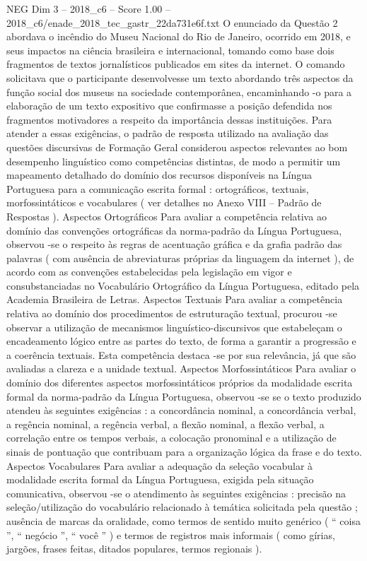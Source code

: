 \begin{textsample}{NEG Dim 3 – 2018\_c6 – Score 1.00 – 2018\_c6/enade\_2018\_tec\_gastr\_22da731e6f.txt}
O enunciado da Questão 2 abordava o incêndio do Museu Nacional do Rio de Janeiro, ocorrido em 2018, e seus impactos na ciência brasileira e internacional, tomando como base dois fragmentos de textos jornalísticos publicados em sites da internet.
O comando solicitava que o participante desenvolvesse um texto abordando três aspectos da função social dos museus na sociedade contemporânea, encaminhando -o para a elaboração de um texto expositivo que confirmasse a posição defendida nos fragmentos motivadores a respeito da importância dessas instituições.
Para atender a essas exigências, o padrão de resposta utilizado na avaliação das questões discursivas de Formação Geral considerou aspectos relevantes ao bom desempenho linguístico como competências distintas, de modo a permitir um mapeamento detalhado do domínio dos recursos disponíveis na Língua Portuguesa para a comunicação escrita formal : ortográficos, textuais, morfossintáticos e vocabulares ( ver detalhes no Anexo VIII – Padrão de Respostas ).
Aspectos Ortográficos Para avaliar a competência relativa ao domínio das convenções ortográficas da norma-padrão da Língua Portuguesa, observou -se o respeito às regras de acentuação gráfica e da grafia padrão das palavras ( com ausência de abreviaturas próprias da linguagem da internet ), de acordo com as convenções estabelecidas pela legislação em vigor e consubstanciadas no Vocabulário Ortográfico da Língua Portuguesa, editado pela Academia Brasileira de Letras.
Aspectos Textuais Para avaliar a competência relativa ao domínio dos procedimentos de estruturação textual, procurou -se observar a utilização de mecanismos linguístico-discursivos que estabeleçam o encadeamento lógico entre as partes do texto, de forma a garantir a progressão e a coerência textuais.
Esta competência destaca -se por sua relevância, já que são avaliadas a clareza e a unidade textual.
Aspectos Morfossintáticos Para avaliar o domínio dos diferentes aspectos morfossintáticos próprios da modalidade escrita formal da norma-padrão da Língua Portuguesa, observou -se se o texto produzido atendeu às seguintes exigências : a concordância nominal, a concordância verbal, a regência nominal, a regência verbal, a flexão nominal, a flexão verbal, a correlação entre os tempos verbais, a colocação pronominal e a utilização de sinais de pontuação que contribuam para a organização lógica da frase e do texto.
Aspectos Vocabulares Para avaliar a adequação da seleção vocabular à modalidade escrita formal da Língua Portuguesa, exigida pela situação comunicativa, observou -se o atendimento às seguintes exigências : precisão na seleção/utilização do vocabulário relacionado à temática solicitada pela questão ; ausência de marcas da oralidade, como termos de sentido muito genérico ( “ coisa ”, “ negócio ”, “ você ” ) e termos de registros mais informais ( como gírias, jargões, frases feitas, ditados populares, termos regionais ).

\end{textsample}
